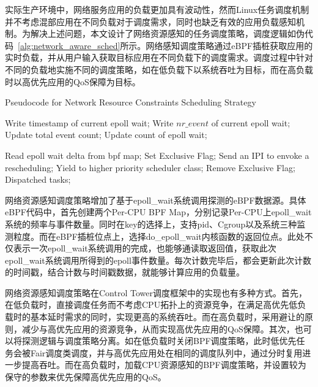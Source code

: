 实际生产环境中，网络服务应用的负载更加具有波动性，然而Linux任务调度机制并不考虑混部应用在不同负载对于调度需求，同时也缺乏有效的应用负载感知机制。为解决上述问题，本文设计了网络资源感知的任务调度策略，调度逻辑如伪代码~\ref{alg:network_aware_sched}所示。网络感知调度策略通过eBPF插桩获取应用的实时负载，并从用户输入获取目标应用在不同负载下的调度需求。调度过程中针对不同的负载地实施不同的调度策略，如在低负载下以系统吞吐为目标，而在高负载时以高优先应用的QoS保障为目标。

\begin{algorithm}[H]
    \caption{Pseudocode for Network Resource Constraints Scheduling Strategy}
    \label{alg:network_aware_sched}
    \begin{algorithmic}[1]

        \State Write timestamp of current epoll wait;
        \State Write $nr\_event$ of current epoll wait;
        \State Update total event count;
        \State Update count of epoll wait;
    \EndFunction

            \State Read epoll wait delta from bpf map;
                \State Set Exclusive Flag;
                    \State Send an IPI to envoke a rescheduling;
                \EndFor
                \State Yield to higher priority scheduler class;
            \EndIf
            \State Remove Exclusive Flag;
            \State Dispatched tasks;
        \EndWhile
    \EndFunction
    \end{algorithmic}
\end{algorithm}

网络资源感知调度策略增加了基于epoll\_wait系统调用探测的eBPF数据源。具体eBPF代码中，首先创建两个Per-CPU BPF Map，分别记录Per-CPU上epoll\_wait系统的频率与事件数量。同时在key的选择上，支持pid、Cgroup以及系统三种监测粒度。而在eBPF插桩位点上，选择do\_epoll\_wait内核函数的返回位点。此处不仅表示一次epoll\_wait系统调用的完成，也能够通读取返回值，获取此次epoll\_wait系统调用所得到的epoll事件数量。每次计数完毕后，都会更新此次计数的时间戳，结合计数与时间戳数据，就能够计算应用的负载量。

网络资源感知调度策略在Control Tower调度框架中的实现也有多种方式。首先，在低负载时，直接调度任务而不考虑CPU拓扑上的资源竞争，在满足高优先低负载时的基本延时需求的同时，实现更高的系统吞吐。而在高负载时，采用避让的原则，减少与高优先应用的资源竞争，从而实现高优先应用的QoS保障。其次，也可以将探测逻辑与调度策略分离。如在低负载时关闭BPF调度策略，此时低优先任务会被Fair调度类调度，并与高优先应用处在相同的调度队列中，通过分时复用进一步提高吞吐。而在高负载时，加载CPU资源感知的BPF调度策略，并设置较为保守的参数来优先保障高优先应用的QoS。

